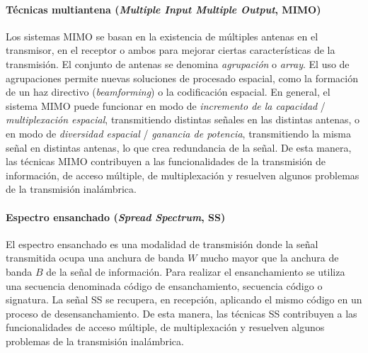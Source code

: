 \documentclass[12pt]{report} %
\begin{document}
\paragraph{Técnicas multiantena (\textit{Multiple Input Multiple Output}, MIMO)}

Los sistemas MIMO se basan en la existencia de múltiples antenas en el transmisor, en el receptor o ambos para mejorar ciertas características  de la transmisión.
\cite{RefWorks:79}
El conjunto de antenas se denomina \textit{agrupación} o \textit{array}.
El uso de agrupaciones permite nuevas soluciones de procesado espacial, como la formación de un haz directivo (\textit{beamforming}) o la codificación espacial.
En general, el sistema MIMO puede funcionar en modo de \textit{incremento de la capacidad} / \textit{multiplexación espacial}, transmitiendo distintas señales en las distintas antenas,
o en modo de \textit{diversidad espacial} / \textit{ganancia de potencia}, transmitiendo la misma señal en distintas antenas, lo que crea redundancia de la señal.
\cite{RefWorks:80}
De esta manera, las técnicas MIMO contribuyen a las funcionalidades de la transmisión de información, de acceso múltiple, de multiplexación y resuelven algunos problemas de la transmisión inalámbrica.
\cite{RefWorks:78}

\paragraph{Espectro ensanchado (\textit{Spread Spectrum}, SS)}

El espectro ensanchado es una modalidad de transmisión donde la señal transmitida ocupa una anchura de banda $W$ mucho mayor que la anchura de banda $B$ de la señal de información.
Para realizar el ensanchamiento se utiliza una secuencia denominada código de ensanchamiento, secuencia código o signatura.
La señal SS se recupera, en recepción, aplicando el mismo código en un proceso de desensanchamiento.
De esta manera, las técnicas SS contribuyen a las funcionalidades de acceso múltiple, de multiplexación y resuelven algunos problemas de la transmisión inalámbrica.
\cite{RefWorks:78, RefWorks:87}
\end{document}
